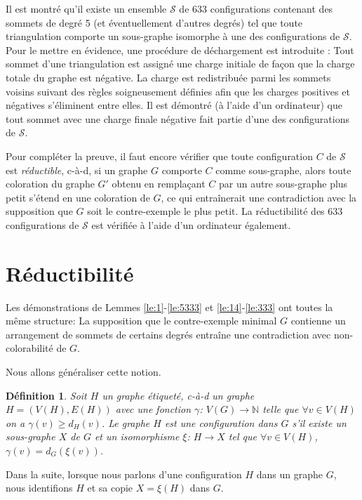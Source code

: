 \documentclass[10pt,a4paper]{article}
\newtheorem{definition}{Définition}
\begin{document}
Il est montré qu'il existe un ensemble $\mathcal{S}$ de 633 configurations contenant des sommets de degré 5 (et éventuellement d'autres degrés) tel que toute triangulation comporte un sous-graphe isomorphe à une des configurations de $\mathcal{S}$. Pour le mettre en évidence, une procédure de déchargement est introduite : Tout sommet d'une triangulation est assigné une charge initiale de façon que la charge totale du graphe est négative. La charge est redistribuée parmi les sommets voisins suivant des règles soigneusement définies afin que les charges positives et négatives s'éliminent entre elles. Il est démontré (à l'aide d'un ordinateur) que tout sommet avec une charge finale négative fait partie d'une des configurations de $\mathcal{S}$.

Pour compléter la preuve, il faut encore vérifier que toute configuration $C$ de $\mathcal{S}$ est \emph{réductible}, c-à-d, si un graphe $G$ comporte $C$ comme sous-graphe, alors toute coloration du graphe $G'$ obtenu en remplaçant $C$ par un autre sous-graphe plus petit s'étend en une coloration de $G$, ce qui entraînerait une contradiction avec la supposition que $G$ soit le contre-exemple le plus petit.
La réductibilité des 633 configurations de $\mathcal{S}$ est vérifiée à l'aide d'un ordinateur également.






\section{Réductibilité}
\label{chap:red}
Les démonstrations de Lemmes \ref{le:1}-\ref{le:5333} et \ref{le:14}-\ref{le:333} ont toutes la même structure: La supposition que le contre-exemple minimal $G$ contienne un arrangement de sommets de certains degrés entraîne une contradiction avec non-colorabilité de $G$.
  

Nous allons généraliser cette notion.

\begin{definition}
Soit $H$ un graphe étiqueté, c-à-d un graphe $H= (V(H), E(H))$ avec une fonction $\gamma$: $V(G) \to \mathbb{N}$ telle que $\forall v \in V(H)$ on a $\gamma(v) \geq d_H(v)$. Le graphe $H$ est une \emph{configuration} dans $G$ s'il existe un sous-graphe $X$ de $G$ et un isomorphisme $\xi$: $H \to X$ tel que $\forall v \in V(H)$, $\gamma(v) = d_G(\xi(v))$. 
\label{de:conf}
\end{definition}

Dans la suite, lorsque nous parlons d'une configuration $H$ dans un graphe $G$, nous identifions $H$ et sa copie $X=\xi(H)$ dans $G$.
\end{document}
